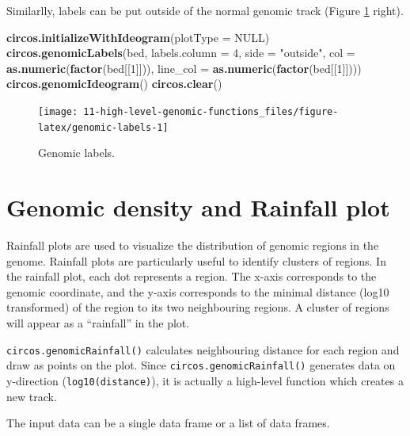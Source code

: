 \documentclass[]{book}
\newenvironment{Shaded}{\begin{snugshade}}{\end{snugshade}}
\newcommand{\KeywordTok}[1]{\textcolor[rgb]{0.13,0.29,0.53}{\textbf{#1}}}
\newcommand{\DataTypeTok}[1]{\textcolor[rgb]{0.13,0.29,0.53}{#1}}
\newcommand{\DecValTok}[1]{\textcolor[rgb]{0.00,0.00,0.81}{#1}}
\newcommand{\StringTok}[1]{\textcolor[rgb]{0.31,0.60,0.02}{#1}}
\newcommand{\OtherTok}[1]{\textcolor[rgb]{0.56,0.35,0.01}{#1}}
\newcommand{\NormalTok}[1]{#1}
\theoremstyle{definition}
\theoremstyle{definition}
\theoremstyle{remark}
\begin{document}
Similarlly, labels can be put outside of the normal genomic track
(Figure \ref{fig:genomic-labels} right).

\begin{Shaded}
\begin{Highlighting}[]
\KeywordTok{circos.initializeWithIdeogram}\NormalTok{(}\DataTypeTok{plotType =} \OtherTok{NULL}\NormalTok{)}
\KeywordTok{circos.genomicLabels}\NormalTok{(bed, }\DataTypeTok{labels.column =} \DecValTok{4}\NormalTok{, }\DataTypeTok{side =} \StringTok{"outside"}\NormalTok{,}
    \DataTypeTok{col =} \KeywordTok{as.numeric}\NormalTok{(}\KeywordTok{factor}\NormalTok{(bed[[}\DecValTok{1}\NormalTok{]])), }\DataTypeTok{line_col =} \KeywordTok{as.numeric}\NormalTok{(}\KeywordTok{factor}\NormalTok{(bed[[}\DecValTok{1}\NormalTok{]])))}
\KeywordTok{circos.genomicIdeogram}\NormalTok{()}
\KeywordTok{circos.clear}\NormalTok{()}
\end{Highlighting}
\end{Shaded}

\begin{figure}

{\centering \texttt{[image: 11-high-level-genomic-functions\_files/figure-latex/genomic-labels-1]} 

}

\caption{Genomic labels.}\label{fig:genomic-labels}
\end{figure}

\section{Genomic density and Rainfall
plot}\label{genomic-density-and-rainfall-plot}

Rainfall plots are used to visualize the distribution of genomic regions
in the genome. Rainfall plots are particularly useful to identify
clusters of regions. In the rainfall plot, each dot represents a region.
The x-axis corresponds to the genomic coordinate, and the y-axis
corresponds to the minimal distance (log10 transformed) of the region to
its two neighbouring regions. A cluster of regions will appear as a
``rainfall'' in the plot.

\texttt{circos.genomicRainfall()} calculates neighbouring distance for
each region and draw as points on the plot. Since
\texttt{circos.genomicRainfall()} generates data on y-direction
(\texttt{log10(distance)}), it is actually a high-level function which
creates a new track.

The input data can be a single data frame or a list of data frames.
\end{document}
